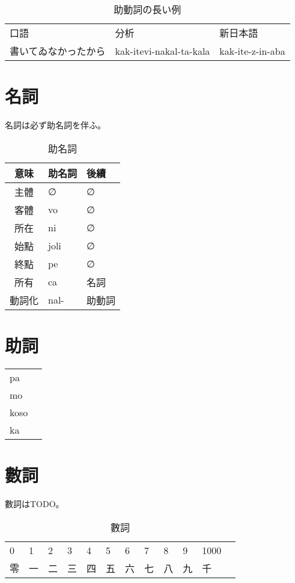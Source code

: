 \documentclass[]{jlreq}
\begin{document}
\begin{table}[h]\centering
  \begin{tabular}{lll}
    口語                 & 分析                    & 新日本語         \\
    書いてゐなかったから & kak-itevi-nakal-ta-kala & kak-ite-z-in-aba
  \end{tabular}
  \caption{助動詞の長い例}
\end{table}

\section{名詞}

名詞は必ず助名詞を伴ふ。

\begin{table}[h]\centering
  \begin{tabular}{cll}
    意味   & 助名詞 & 後續   \\
    \hline
    主體   & ∅      & ∅      \\
    客體   & vo     & ∅      \\
    所在   & ni     & ∅      \\
    始點   & joli   & ∅      \\
    終點   & pe     & ∅      \\
    所有   & ca     & 名詞   \\
    動詞化 & nal-   & 助動詞 \\
  \end{tabular}
  \caption{助名詞}
\end{table}

\section{助詞}

\begin{tabular}{ll}
  pa   & \\
  mo   & \\
  koso & \\
  ka   &
\end{tabular}

\section{數詞}

數詞はTODO。

\begin{table}[h]\centering
  \begin{tabular}{llllllllllll}
    0  & 1  & 2  & 3  & 4  & 5  & 6  & 7  & 8  & 9  & 1000 \\
    零 & 一 & 二 & 三 & 四 & 五 & 六 & 七 & 八 & 九 & 千   \\
  \end{tabular}
  \caption{數詞}
\end{table}
\end{document}
